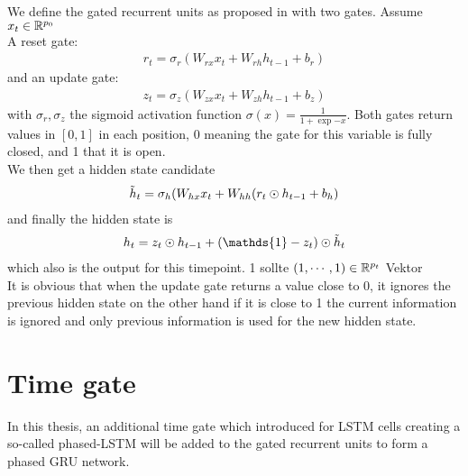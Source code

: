 \begin{definition}
    We define the gated recurrent units as proposed in \cite{cho-2014} with two gates. Assume $x_t \in \mathbb{R} ^{p_0}$\\
    A reset gate:
    \begin{align} \label{eq:resetgate}
        r_t= \sigma_r\left(W_{rx} x_t + W_{rh} h_{t-1} + b_r\right)
    \end{align}
    and an update gate:
    \begin{align} \label{eq:updategate}
    z_t= \sigma_z\left(W_{zx} x_t + W_{zh} h_{t-1} + b_z\right) \end{align}
    with $\sigma_r,\sigma_z$ the sigmoid activation function $\sigma(x)=\frac{1}{1+\exp{-x}}$. Both gates return values in $[0,1]$ in each position, 0 meaning the gate for this variable is fully closed, and 1 that it is open.\\
    We then get a hidden state candidate
    \begin{align} \label{eq:candidate}
    \Tilde{h}_t=\sigma_h(W_{hx} x_t+W_{hh} (r_t\odot h_{t-1} + b_h )
    \end{align}
    and finally the hidden state is
    \begin{align} \label{eq:hiddenstate}
    h_t=z_t\odot h_{t-1} +(\mathds{1} - z_t)\odot \Tilde{h}_t
    \end{align}
    which also is the output for this timepoint.
    \color{red} 1 sollte $(1,\cdots,1) \in \mathbb{R}^{p_t}$ Vektor \\ \color{black} It is obvious that when the update gate returns a value close to 0,  it ignores the previous hidden state on the other hand if it is close to 1 the current information is ignored and only previous information is used for the new hidden state.
\end{definition}

\section{Time gate}
In this thesis, an additional time gate which \cite{neil-2016} introduced for LSTM cells creating a so-called phased-LSTM will be added to the gated recurrent units to form a phased GRU network. 

